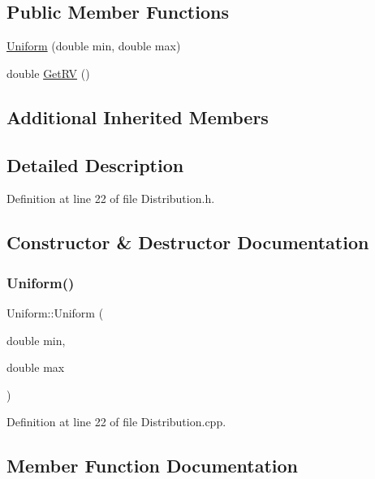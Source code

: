 \subsection*{Public Member Functions}
\begin{DoxyCompactItemize}
\item 
\hyperlink{class_uniform_a9c9a8915fe92ac802a55dd3875045a73}{Uniform} (double min, double max)
\item 
double \hyperlink{class_uniform_a9350886d5ad1854294ecff338a288fc7}{Get\+RV} ()
\end{DoxyCompactItemize}
\subsection*{Additional Inherited Members}


\subsection{Detailed Description}


Definition at line 22 of file Distribution.\+h.



\subsection{Constructor \& Destructor Documentation}
\mbox{\label{class_uniform_a9c9a8915fe92ac802a55dd3875045a73}} 
\subsubsection{\texorpdfstring{Uniform()}{Uniform()}}
{\footnotesize\ttfamily Uniform\+::\+Uniform (\begin{DoxyParamCaption}\item[{double}]{min,  }\item[{double}]{max }\end{DoxyParamCaption})}



Definition at line 22 of file Distribution.\+cpp.



\subsection{Member Function Documentation}
\mbox{\label{class_uniform_a9350886d5ad1854294ecff338a288fc7}} 
